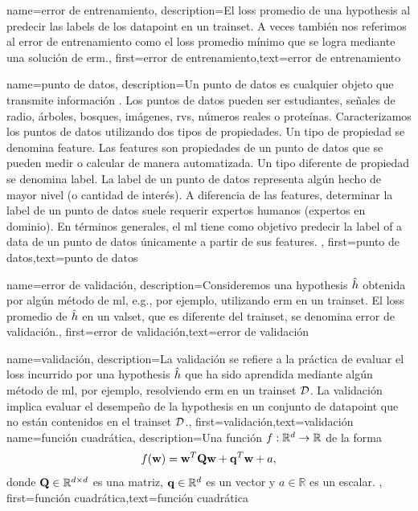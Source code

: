  {
	 name={error de entrenamiento},
	 description={El \gls{loss} promedio de una \gls{hypothesis} al 
		 predecir las \gls{label}s de los \gls{datapoint} en un \gls{trainset}. 
		 A veces también nos referimos al error de entrenamiento como el \gls{loss} promedio mínimo 
		 que se logra mediante una solución de \gls{erm}.},
		 first={error de entrenamiento},text={error de entrenamiento}  
 }

{name={punto de datos},
description={Un punto de datos es cualquier objeto que transmite información \cite{coverthomas}.
		Los puntos de datos pueden ser estudiantes, señales de radio, árboles, bosques, imágenes, \gls{rv}s, números reales o proteínas.
		Caracterizamos los puntos de datos utilizando dos tipos de propiedades. Un tipo de propiedad se denomina \gls{feature}. 
		Las \Gls{feature}s son propiedades de un punto de datos que se pueden medir o calcular de manera automatizada.  
		Un tipo diferente de propiedad se denomina \gls{label}. La \gls{label} de un punto de datos representa 
		algún hecho de mayor nivel (o cantidad de interés). A diferencia de las \gls{feature}s, determinar la \gls{label} de un punto de datos suele requerir expertos humanos (expertos en dominio). 
		En términos generales, el \gls{ml} tiene como objetivo predecir la
		\gls{label} of a \gls{data} de un punto de datos únicamente a partir de sus  \gls{feature}s. 
		}, first={punto de datos},text={punto de datos}  
}


{name={error de validación},
 description={Consideremos una \gls{hypothesis} $\hat{h}$ obtenida por algún método de
 	\gls{ml}, e.g., por ejemplo, utilizando \gls{erm} en un \gls{trainset}. El \gls{loss} promedio de
 	$\hat{h}$ en un \gls{valset}, que es diferente del \gls{trainset},  se denomina error de validación.},
	first={error de validación},text={error de validación}  
}

{
	name={validación},
	description={La validación se refiere a la práctica de evaluar el \gls{loss} incurrido por una 
		\gls{hypothesis} $\hat{h}$ que ha sido aprendida mediante algún método de \gls{ml}, 
		por ejemplo, resolviendo \gls{erm} en un \gls{trainset} $\mathcal{D}$. La validación implica evaluar 
		el desempeño de la \gls{hypothesis} en un conjunto de \gls{datapoint} que no están contenidos 
		en el \gls{trainset} $\mathcal{D}$.}, 
	first={validación},text={validación}  
}
{name={función cuadrática},
	description={Una función $f: \mathbb{R}^{d} \rightarrow \mathbb{R}$ de la forma
	$$f({\bf w}) =  {\bf w}^{T} \mathbf{Q} \mathbf{w} + \mathbf{q}^{T} {\bf w}+a,$$ donde 
	$\mathbf{Q} \in \mathbb{R}^{d \times d}$ es una matriz, ${\bf q} \in \mathbb{R}^{d}$ es un vector
	y $a \in \mathbb{R}$ es un escalar. },
	first={función cuadrática},text={función cuadrática}  
}

